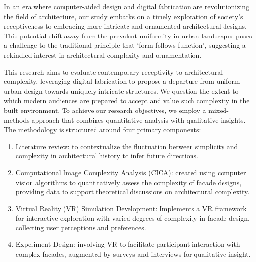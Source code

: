 


In an era where computer-aided design and digital fabrication are revolutionizing the field of architecture, our study embarks on a timely exploration of society's receptiveness to embracing more intricate and ornamented architectural designs.
This potential shift away from the prevalent uniformity in urban landscapes poses a challenge to the traditional principle that `form follows function'\cite{Gage2015}, suggesting a rekindled interest in architectural complexity and ornamentation.

This research aims to evaluate contemporary receptivity to architectural complexity, leveraging digital fabrication to propose a departure from uniform urban design towards uniquely intricate structures.
We question the extent to which modern audiences are prepared to accept and value such complexity in the built environment.
To achieve our research objectives, we employ a mixed-methods approach that combines quantitative analysis with qualitative insights.
The methodology is structured around four primary components:

\begin{enumerate}
    \item Literature review: to contextualize the fluctuation between simplicity and complexity in architectural history to infer future directions.
    \item Computational Image Complexity Analysis (CICA): created using computer vision algorithms to quantitatively assess the complexity of facade designs, providing data to support theoretical discussions on architectural complexity.
    \item Virtual Reality (VR) Simulation Development: Implements a VR framework for interactive exploration with varied degrees of complexity in facade design, collecting user perceptions and preferences.
    \item Experiment Design: involving VR to facilitate participant interaction with complex facades, augmented by surveys and interviews for qualitative insight.
\end{enumerate}

